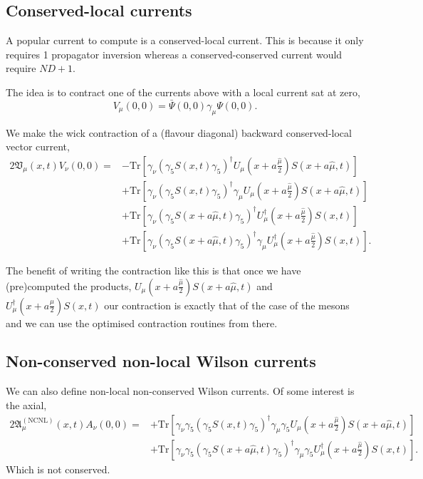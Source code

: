 \subsection{Conserved-local currents}

A popular current to compute is a conserved-local current. This is
because it only requires 1 propagator inversion whereas a 
conserved-conserved current would require $ND+1$.

The idea is to contract one of the currents above with a local
current sat at zero,
\begin{equation}
V_\mu(0,0) = \bar{\Psi}(0,0) \gamma_\mu \Psi(0,0).
\end{equation}

We make the wick contraction of a (flavour diagonal) backward conserved-local vector current,
\begin{equation}
\begin{aligned}
2\mathfrak{V}_\mu(x,t)V_\nu(0,0) =& 
-\text{Tr}\left[ \gamma_\nu \left( \gamma_5 S(x,t) \gamma_5 \right)^{\dagger} U_\mu\left( x + a\frac{\hat{\mu}}{2}\right) S(x+a\hat{\mu},t) \right] \\
& + \text{Tr}\left[ \gamma_\nu \left( \gamma_5 S(x,t) \gamma_5 \right)^{\dagger} \gamma_\mu U_\mu\left( x + a\frac{\hat{\mu}}{2}\right) S(x+a\hat{\mu},t) \right] \\
& + \text{Tr}\left[ \gamma_\nu \left( \gamma_5 S(x+a\hat{\mu},t) \gamma_5 \right)^{\dagger} U_\mu^{\dagger}\left( x + a\frac{\hat{\mu}}{2}\right) S(x,t) \right] \\
& + \text{Tr}\left[ \gamma_\nu \left( \gamma_5 S(x+a\hat{\mu},t) \gamma_5 \right)^{\dagger} \gamma_\mu U_\mu^{\dagger}\left( x + a\frac{\hat{\mu}}{2}\right) S(x,t) \right].
\end{aligned}
\end{equation}

The benefit of writing the contraction like this is that once we have (pre)computed the products,
$U_\mu\left( x + a\frac{\hat{\mu}}{2}\right) S(x+a\hat{\mu},t)$ and
$U_\mu^{\dagger}\left( x + a\frac{\hat{\mu}}{2}\right) S(x,t)$ our contraction is exactly that of
the case of the mesons and we can use the optimised contraction routines from there.

\subsection{Non-conserved non-local Wilson currents}

We can also define non-local non-conserved Wilson currents. Of some interest is the axial,
\begin{equation}
\begin{aligned}
2\mathfrak{A}_\mu^{(\text{NCNL})}(x,t)A_\nu(0,0) =& 
+\text{Tr}\left[ \gamma_\nu \gamma_5 \left( \gamma_5 S(x,t) \gamma_5 \right)^{\dagger} \gamma_\mu \gamma_5 U_\mu\left( x + a\frac{\hat{\mu}}{2}\right) S(x+a\hat{\mu},t) \right] \\
&+ \text{Tr}\left[ \gamma_\nu \gamma_5 \left( \gamma_5 S(x+a\hat{\mu},t) \gamma_5 \right)^{\dagger} \gamma_\mu \gamma_5 U_\mu^{\dagger}\left( x + a\frac{\hat{\mu}}{2}\right) S(x,t) \right].
\end{aligned}
\end{equation}
Which is not conserved.

